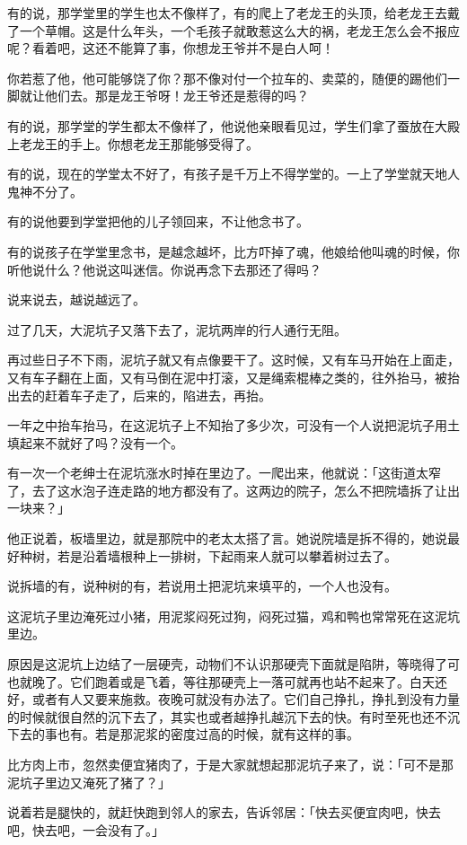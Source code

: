 \documentclass[UTF8]{ctexart}
\begin{document}
有的说，那学堂里的学生也太不像样了，有的爬上了老龙王的头顶，给老龙王去戴了一个草帽。这是什么年头，一个毛孩子就敢惹这么大的祸，老龙王怎么会不报应呢？看着吧，这还不能算了事，你想龙王爷并不是白人呵！

你若惹了他，他可能够饶了你？那不像对付一个拉车的、卖菜的，随便的踢他们一脚就让他们去。那是龙王爷呀！龙王爷还是惹得的吗？

有的说，那学堂的学生都太不像样了，他说他亲眼看见过，学生们拿了蚕放在大殿上老龙王的手上。你想老龙王那能够受得了。

有的说，现在的学堂太不好了，有孩子是千万上不得学堂的。一上了学堂就天地人鬼神不分了。

有的说他要到学堂把他的儿子领回来，不让他念书了。

有的说孩子在学堂里念书，是越念越坏，比方吓掉了魂，他娘给他叫魂的时候，你听他说什么？他说这叫迷信。你说再念下去那还了得吗？

说来说去，越说越远了。

过了几天，大泥坑子又落下去了，泥坑两岸的行人通行无阻。

再过些日子不下雨，泥坑子就又有点像要干了。这时候，又有车马开始在上面走，又有车子翻在上面，又有马倒在泥中打滚，又是绳索棍棒之类的，往外抬马，被抬出去的赶着车子走了，后来的，陷进去，再抬。

一年之中抬车抬马，在这泥坑子上不知抬了多少次，可没有一个人说把泥坑子用土填起来不就好了吗？没有一个。

有一次一个老绅士在泥坑涨水时掉在里边了。一爬出来，他就说：「这街道太窄了，去了这水泡子连走路的地方都没有了。这两边的院子，怎么不把院墙拆了让出一块来？」

他正说着，板墙里边，就是那院中的老太太搭了言。她说院墙是拆不得的，她说最好种树，若是沿着墙根种上一排树，下起雨来人就可以攀着树过去了。

说拆墙的有，说种树的有，若说用土把泥坑来填平的，一个人也没有。

这泥坑子里边淹死过小猪，用泥浆闷死过狗，闷死过猫，鸡和鸭也常常死在这泥坑里边。

原因是这泥坑上边结了一层硬壳，动物们不认识那硬壳下面就是陷阱，等晓得了可也就晚了。它们跑着或是飞着，等往那硬壳上一落可就再也站不起来了。白天还好，或者有人又要来施救。夜晚可就没有办法了。它们自己挣扎，挣扎到没有力量的时候就很自然的沉下去了，其实也或者越挣扎越沉下去的快。有时至死也还不沉下去的事也有。若是那泥浆的密度过高的时候，就有这样的事。

比方肉上市，忽然卖便宜猪肉了，于是大家就想起那泥坑子来了，说：「可不是那泥坑子里边又淹死了猪了？」

说着若是腿快的，就赶快跑到邻人的家去，告诉邻居：「快去买便宜肉吧，快去吧，快去吧，一会没有了。」
\end{document}

